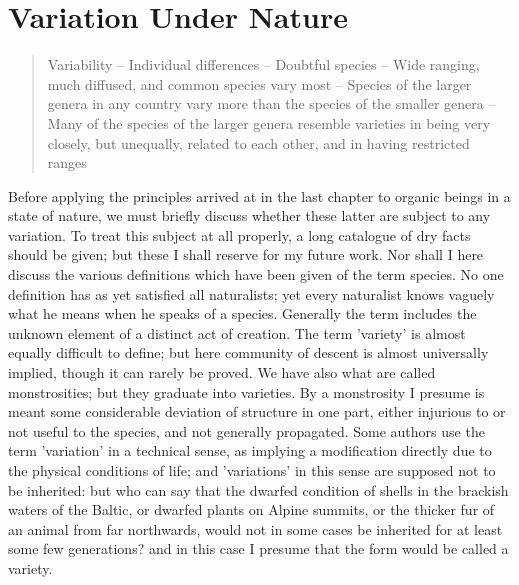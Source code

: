 \chapter{Variation Under Nature}

\begin{quotation}
Variability -- Individual differences -- Doubtful species -- Wide ranging, much diffused, and common species vary most -- Species of the larger genera in any country vary more than the species of the smaller genera -- Many of the species of the larger genera resemble varieties in being very closely, but unequally, related to each other, and in having restricted ranges
\end{quotation}

\indent Before applying the principles arrived at in the last chapter to organic beings in a state of nature, we must briefly discuss whether these latter are subject to any variation. To treat this subject at all properly, a long catalogue of dry facts should be given; but these I shall reserve for my future work. Nor shall I here discuss the various definitions which have been given of the term species. No one definition has as yet satisfied all naturalists; yet every naturalist knows vaguely what he means when he speaks of a species. Generally the term includes the unknown element of a distinct act of creation.  The term 'variety' is almost equally difficult to define; but here community of descent is almost universally implied, though it can rarely be proved. We have also what are called monstrosities; but they graduate into varieties. By a monstrosity I presume is meant some considerable deviation of structure in one part, either injurious to or not useful to the species, and not generally propagated. Some authors use the term 'variation' in a technical sense, as implying a modification directly due to the physical conditions of life; and 'variations' in this sense are supposed not to be inherited: but who can say that the dwarfed condition of shells in the brackish waters of the Baltic, or dwarfed plants on Alpine summits, or the thicker fur of an animal from far northwards, would not in some cases be inherited for at least some few generations? and in this case I presume that the form would be called a variety. \\
